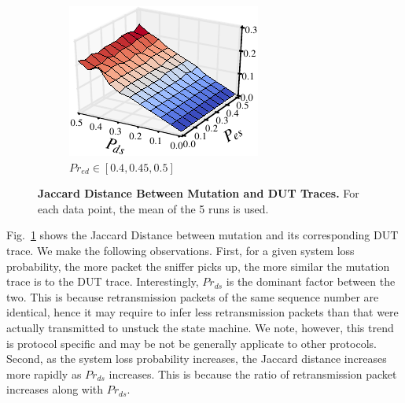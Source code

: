 \begin{figure}[h!]
\begin{subfigure}{0.33\textwidth}
  \end{subfigure}\hspace*{0.01\textwidth}
  \begin{subfigure}{0.33\textwidth}
    \centering
    \includegraphics[width=\textwidth]{./figures/scripts/MutationDUTJaccard3DFigure_0_50.pdf}
    \caption{$Pr_{ed} \in [0.4, 0.45, 0.5]$}
  \end{subfigure}\hspace*{0.01\textwidth}
  \caption{\textbf{Jaccard Distance Between Mutation and DUT Traces.} For each
  data point, the mean of the 5 runs is used.}
  \label{fig:mutation_dut}
\end{figure}


Fig.~\ref{fig:mutation_dut} shows the Jaccard Distance between mutation and
its corresponding DUT trace.
We make the following observations.
First, for a given system loss probability, the more packet the sniffer picks up,
the more similar the mutation trace is to the DUT trace.
Interestingly, $Pr_{ds}$ is the dominant factor between the two.
This is because retransmission packets of the same sequence number are
identical, hence it may require to infer less retransmission packets than that
were actually transmitted to unstuck the state machine.
We note, however, this
trend is protocol specific and may be not be generally applicate to other
protocols.
Second, as the system loss probability increases, the Jaccard distance increases
more rapidly as $Pr_{ds}$ increases.
This is because the ratio of retransmission
packet increases along with $Pr_{ds}$.



